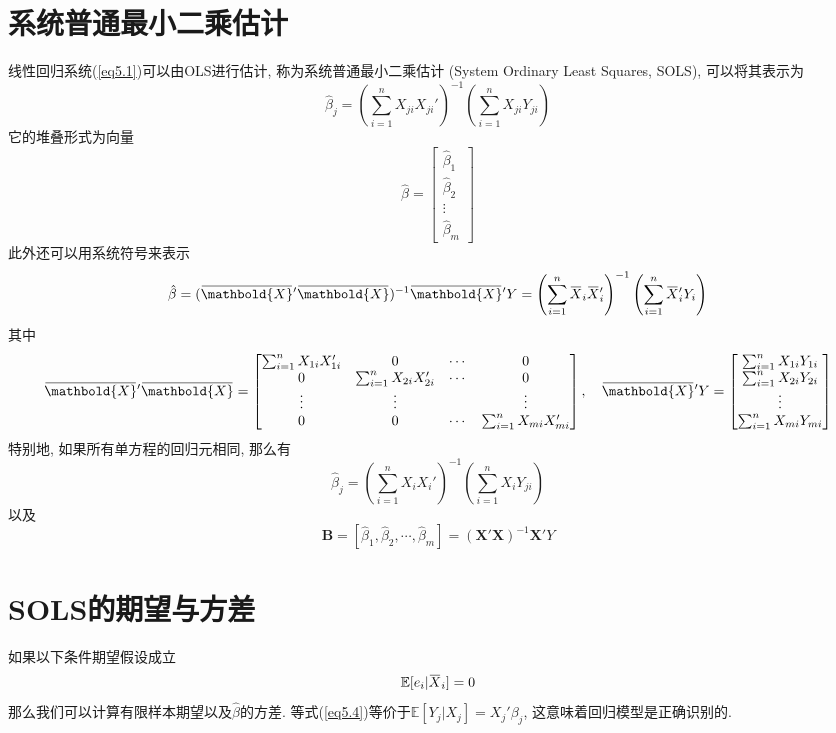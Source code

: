 \documentclass[cn, 12pt, math=mtpro2, bibstyle=apa, blue, twocol]{elegantbook}
\newcommand{\E}{\mathbb{E}}
\newcommand{\X}{\mathbold{X}}
\newcommand{\hb}{\hat{\beta}}
\newcommand{\OX}{\overbar{X}}
\newcommand{\overbar}[1]{\mkern 1.5mu\overline{\mkern-1.5mu#1\mkern-1.5mu}\mkern 1.5mu}
\begin{document}
\section{系统普通最小二乘估计}
线性回归系统(\ref{eq5.1})可以由OLS进行估计, 称为系统普通最小二乘估计 (System Ordinary Least Squares, SOLS), 可以将其表示为
$$\hat{\beta}_j=\left(\sum_{i=1}^{n}X_{ji}X_{ji}'\right)^{-1}\left(\sum_{i=1}^{n}X_{ji}Y_{ji}\right)$$
它的堆叠形式为向量
$$\hb=\begin{bmatrix}
        \hb_1 \\
        \hb_2 \\
        \vdots \\
        \hb_m
      \end{bmatrix}$$
此外还可以用系统符号来表示
\begin{equation}\label{eq5.2}
  \hb=(\overbar{\X}'\overbar{\X})^{-1}\overbar{\X}'Y=\left(\sum_{i=1}^{n}\overbar{X}_i\overbar{X}_i'\right)^{-1}\left(\sum_{i=1}^{n}\overbar{X}_i'Y_i\right)
\end{equation}
其中
$$\overbar{\X}'\overbar{\X}=\begin{bmatrix}
          \sum_{i=1}^{n}X_{1i}X_{1i}' & 0 & \cdots & 0 \\
          0 & \sum_{i=1}^{n}X_{2i}X_{2i}' & \cdots & 0 \\
          \vdots & \vdots &  & \vdots \\
          0 & 0 & \cdots & \sum_{i=1}^{n}X_{mi}X_{mi}'
        \end{bmatrix},\quad \overbar{\X}'Y=\begin{bmatrix}
                                   \sum_{i=1}^{n}X_{1i}Y_{1i} \\
                                   \sum_{i=1}^{n}X_{2i}Y_{2i} \\
                                   \vdots \\
                                   \sum_{i=1}^{n}X_{mi}Y_{mi}
                                 \end{bmatrix}$$
特别地, 如果所有单方程的回归元相同, 那么有
$$\hb_j=\left(\sum_{i=1}^{n}X_iX_i'\right)^{-1}\left(\sum_{i=1}^{n}X_iY_{ji}\right)$$
以及
$$\mathbold{B}=[
                 \hb_1, \hb_2, \cdots, \hb_m
               ]=(\X'\X)^{-1}\X'Y$$
\section{SOLS的期望与方差}
如果以下条件期望假设成立
\begin{equation}\label{eq5.4}
  \E[e_i|\OX_i]=0
\end{equation}
那么我们可以计算有限样本期望以及$\hb$的方差. 等式(\ref{eq5.4})等价于$\E[Y_j|X_j]=X_j'\beta_j$, 这意味着回归模型是正确识别的.
\end{document}
